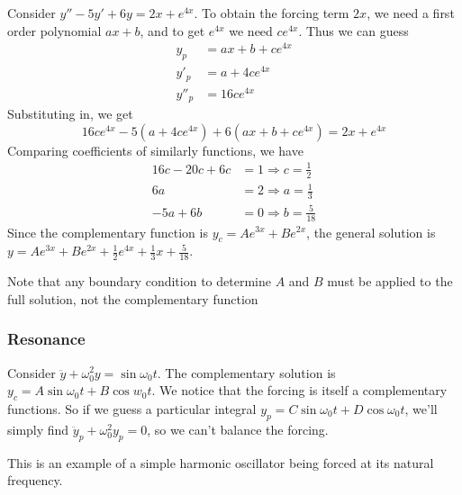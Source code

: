 \documentclass[a4paper]{article}
\begin{document}
\begin{eg}
  Consider $y'' - 5y' + 6y = 2x + e^{4x}$. To obtain the forcing term $2x$, we need a first order polynomial $ax + b$, and to get $e^{4x}$ we need $ce^{4x}$. Thus we can guess
  \begin{align*}
    y_p &= ax + b + ce^{4x}\\
    y'_p &= a + 4ce^{4x}\\
    y''_p &= 16ce^{4x}
  \end{align*}
  Substituting in, we get
  \[
    16ce^{4x} - 5(a + 4ce^{4x}) + 6(ax + b + ce^{4x}) = 2x + e^{4x}
  \]
  Comparing coefficients of similarly functions, we have
  \begin{align*}
    16c - 20c + 6c &= 1\Rightarrow c = \frac{1}{2}\\
    6a &= 2 \Rightarrow a = \frac{1}{3}\\
    -5a + 6b &= 0 \Rightarrow b = \frac{5}{18}
  \end{align*}
  Since the complementary function is $y_c = Ae^{3x} + Be^{2x}$, the general solution is $y = Ae^{3x} + Be^{2x} + \frac{1}{2}e^{4x} + \frac{1}{3}x + \frac{5}{18}$.

  Note that any boundary condition to determine $A$ and $B$ must be applied to the full solution, not the complementary function
\end{eg}
\subsubsection{Resonance}
Consider $\ddot y + \omega_0^2 y = \sin \omega_0 t$. The complementary solution is $y_c = A\sin \omega_0 t + B\cos w_0 t$. We notice that the forcing is itself a complementary functions. So if we guess a particular integral $y_p = C\sin \omega_0 t + D\cos \omega_0 t$, we'll simply find $\ddot y_p + \omega_0 ^2 y_p = 0$, so we can't balance the forcing.

This is an example of a simple harmonic oscillator being forced at its natural frequency.
\end{document}
